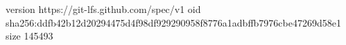 version https://git-lfs.github.com/spec/v1
oid sha256:ddfb42b12d20294475d4f98df929290958f8776a1adbffb7976cbe47269d58e1
size 145493
